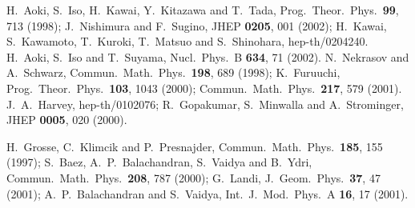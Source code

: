 \documentclass[a4paper,prl,showpacs,twocolumn]{revtex4}
\begin{document}
\begin{thebibliography}{all}
H.~Aoki, S.~Iso, H.~Kawai, Y.~Kitazawa and T.~Tada,
Prog.\ Theor.\ Phys.\  {\bf 99}, 713 (1998);
J.~Nishimura and F.~Sugino,
JHEP {\bf 0205}, 001 (2002);
H.~Kawai, S.~Kawamoto, T.~Kuroki, T.~Matsuo and S.~Shinohara,
hep-th/0204240.
%
H.~Aoki, S.~Iso and T.~Suyama,
Nucl.\ Phys.\ B {\bf 634}, 71 (2002).
N.~Nekrasov and A.~Schwarz,
Commun.\ Math.\ Phys.\  {\bf 198}, 689 (1998);
K.~Furuuchi,
Prog.\ Theor.\ Phys.\  {\bf 103}, 1043 (2000);
Commun.\ Math.\ Phys.\  {\bf 217}, 579 (2001).
J.~A.~Harvey,
hep-th/0102076;
%
R.~Gopakumar, S.~Minwalla and A.~Strominger,
JHEP {\bf 0005}, 020 (2000).

H.~Grosse, C.~Klimcik and P.~Presnajder,
Commun.\ Math.\ Phys.\  {\bf 185}, 155 (1997);
%
%
S.~Baez, A.~P.~Balachandran, S.~Vaidya and B.~Ydri,
Commun.\ Math.\ Phys.\  {\bf 208}, 787 (2000);
%
G.~Landi,
J.\ Geom.\ Phys.\  {\bf 37}, 47 (2001);
%
A.~P.~Balachandran and S.~Vaidya,
Int.\ J.\ Mod.\ Phys.\ A {\bf 16}, 17 (2001).


\end{thebibliography}
\end{document}
